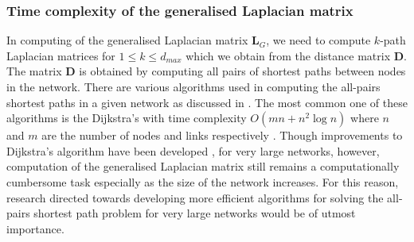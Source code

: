 \documentclass[10pt,a4paper]{article}
\theoremstyle{plain}
\theoremstyle{definition}
\begin{document}
        \subsubsection{Time complexity of the generalised Laplacian matrix} 
        In computing of the generalised Laplacian matrix $\mathbf{L}_G$, we need to compute $k$-path Laplacian matrices for $1 \leq k \leq d_{max}$ which we obtain from the distance matrix $\mathbf{D}$. The matrix $\mathbf{D}$ is obtained by computing all pairs of shortest paths between nodes in the network. There are various algorithms used in computing the all-pairs shortest paths in a given network as discussed in \citep{cherkassky1996shortest}. The most common one of these algorithms is the Dijkstra's with time complexity $O(mn+n^2 \log n)$ where $n$ and $m$ are the number of nodes and links respectively \citep{dijkstra1959note,fredman1987fibonacci}. Though improvements to Dijkstra's algorithm have been developed \citep{pettie2002faster,thorup1999undirected,seidel1995all}, for very large networks, however, computation of the generalised Laplacian matrix still remains a computationally cumbersome task especially as the size of the network increases. For this reason, research directed towards developing more efficient algorithms for solving the all-pairs shortest path problem for very large networks would be of utmost importance. 
        
        
        
\end{document}

